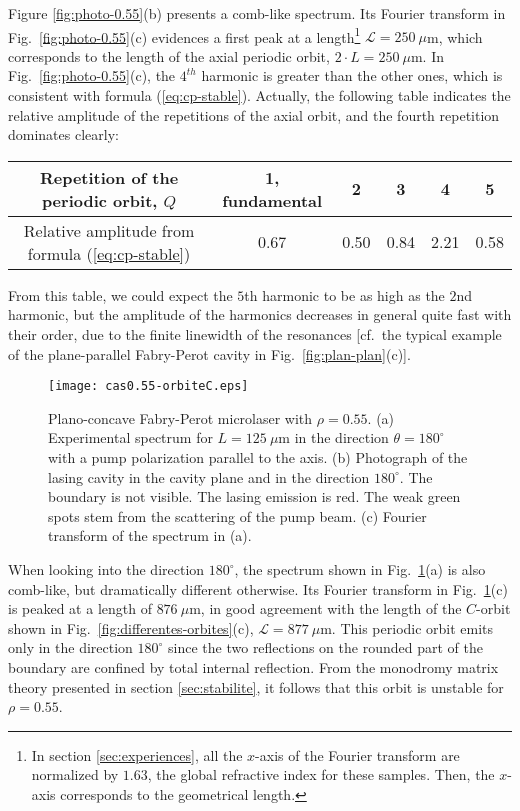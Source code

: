 \documentclass[10pt]{iopart}
\begin{document}
Figure \ref{fig:photo-0.55}(b) presents a comb-like spectrum. Its Fourier transform in Fig.~\ref{fig:photo-0.55}(c) evidences a first peak at a length\footnote{In section \ref{sec:experiences}, all the $x$-axis of the Fourier transform are normalized by $1.63$, the global refractive index for these samples. Then, the $x$-axis corresponds to the geometrical length.} $\mathcal{L} = 250~\mu$m, which corresponds to the length of the axial periodic orbit, $2 \cdot L = 250~\mu$m. In Fig.~\ref{fig:photo-0.55}(c), the $4^{th}$ harmonic is greater than the other ones, which is consistent with formula (\ref{eq:cp-stable}). Actually, the following table indicates the relative amplitude of the repetitions of the axial orbit, and the fourth repetition dominates clearly:
\begin{center}
\begin{tabular}{|c|c|c|c|c|c|}
  \hline
  Repetition of the periodic orbit,
$Q$ & 1, fundamental & 2  & 3 & 4 & 5 \\
  \hline
 Relative amplitude from
  formula (\ref{eq:cp-stable}) & 0.67 & 0.50 & 0.84 & 2.21 & 0.58 \\
  \hline
\end{tabular}
\end{center}
From this table, we could expect the $5$th harmonic to be as high as the $2$nd harmonic, but the amplitude of the harmonics decreases in general quite fast with their order, due to the finite linewidth of the resonances [cf.\ the typical example of the plane-parallel Fabry-Perot cavity in Fig.~\ref{fig:plan-plan}(c)].\\

\begin{figure}
\begin{center}
\texttt{[image: cas0.55-orbiteC.eps]}
\end{center}
\caption{Plano-concave Fabry-Perot microlaser with $\rho = 0.55$. (a) Experimental spectrum for $L=125~\mu$m in the direction $\theta = 180^{\circ}$ with a pump polarization parallel to the axis. (b) Photograph of the lasing cavity in the cavity plane and in the direction $180^{\circ}$. The boundary is not visible. The lasing emission is red. The weak green spots stem from the scattering of the pump beam. (c) Fourier transform of the spectrum in (a).}
\label{fig:photo-0.55-orbite-droite}
\end{figure}

When looking into the direction $180^{\circ}$, the spectrum shown in Fig.~\ref{fig:photo-0.55-orbite-droite}(a) is also comb-like, but dramatically different otherwise. Its Fourier transform in Fig.~\ref{fig:photo-0.55-orbite-droite}(c) is peaked at a length of $876~\mu$m, in good agreement with the length of the $C$-orbit shown in Fig.~\ref{fig:differentes-orbites}(c), $\mathcal{L} = 877~\mu$m. This periodic orbit emits only in the direction $180^{\circ}$ since the two reflections on the rounded part of the boundary are confined by total internal reflection. From the monodromy matrix theory presented in section \ref{sec:stabilite}, it follows that this orbit is unstable for $\rho=0.55$. %
\end{document}
